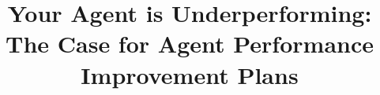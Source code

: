 \documentclass[conference]{IEEEtran}
\begin{document}
\title{Your Agent is Underperforming:\\
The Case for Agent Performance Improvement Plans}

\author{
}

\maketitle















\end{document}
